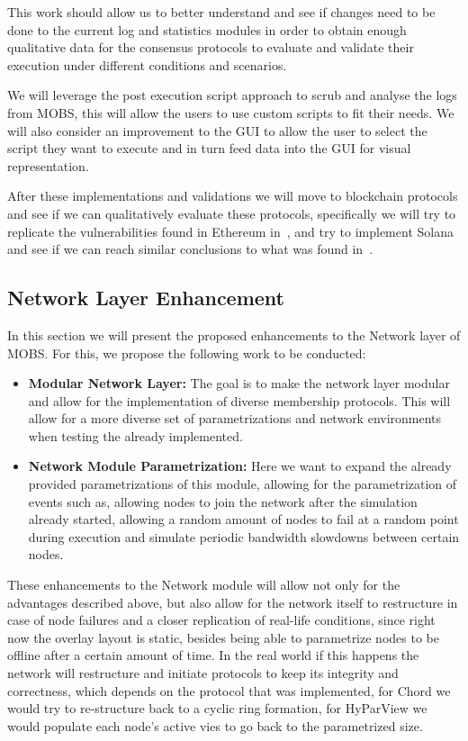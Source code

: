 This work should allow us to better understand and see if changes
need to be done to the current log and statistics modules in order to obtain enough qualitative
data for the consensus protocols to evaluate and validate their execution under different
conditions and scenarios.

We will leverage the post execution script approach to scrub and analyse the logs from MOBS,
this will allow the users to use custom scripts to fit their needs. We will also consider an
improvement to the GUI to allow the user to select the script they want to execute and in turn
feed data into the GUI for visual representation.

After these implementations and validations we will move to blockchain protocols and see
if we can qualitatively evaluate these protocols, specifically we will try to
replicate the vulnerabilities found in Ethereum in~\cite{ethereum_analysis}, and try
to implement Solana and see if we can reach similar conclusions to what was found in~\cite{solana_halting_problem}.

\subsection{Network Layer Enhancement}\label{subsec:network_layer_enchancement}

In this section we will present the proposed enhancements to the Network layer of
MOBS. For this, we propose the following work to be conducted:

\begin{itemize}
  \item \textbf{Modular Network Layer:} The goal is to make the network layer
modular and allow for the implementation of diverse membership protocols. This
will allow for a more diverse set of parametrizations and network environments
when testing the already implemented.
  \item \textbf{Network Module Parametrization:} Here we want to expand the already
provided parametrizations of this module, allowing for the parametrization of events
such as, allowing nodes to join the network after the simulation already started,
allowing a random amount of nodes to fail at a random point during execution and
simulate periodic bandwidth slowdowns between certain nodes.
\end{itemize}

These enhancements to the Network module will allow not only for the advantages
described above, but also allow for the network itself to restructure in case of
node failures and a closer replication of real-life conditions, since right now the
overlay layout is static, besides being able to parametrize nodes to be offline after
a certain amount of time. In the real world if this happens the network will restructure
and initiate protocols to keep its integrity and correctness, which depends on the
protocol that was implemented, for Chord we would try to re-structure back to a cyclic
ring formation, for HyParView we would populate each node's active vies to go back to the
parametrized size.

